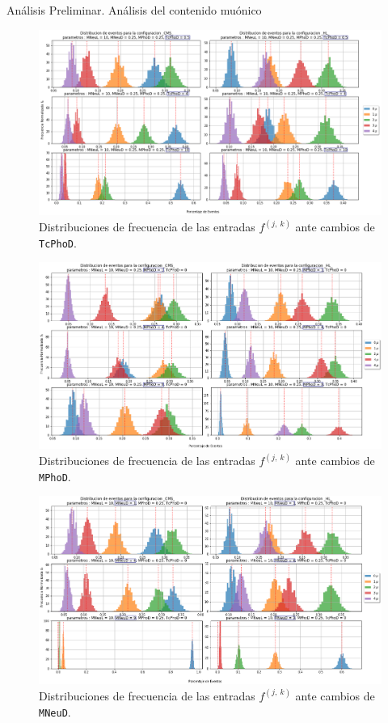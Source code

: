 \begin{frame}{Análisis Preliminar. Análisis del contenido muónico}
\begin{figure}[h]
\centering
\includegraphics[width=.9\textwidth]{Imag/Distribucion_Entries.png}
\caption{Distribuciones de frecuencia de las entradas $f^{(j,~k)}$ ante cambios de \texttt{TcPhoD}.}
\end{figure}

\framebreak

\begin{figure}[h]
\centering
\includegraphics[width=.9\textwidth]{Imag/Distribucion_Entries2.png}
\caption{Distribuciones de frecuencia de las entradas $f^{(j,~k)}$ ante cambios de \texttt{MPhoD}.}
\end{figure}

\framebreak

\begin{figure}[h]
\centering
\includegraphics[width=.9\textwidth]{Imag/Distribucion_Entries3.png}
\caption{Distribuciones de frecuencia de las entradas $f^{(j,~k)}$ ante cambios de \texttt{MNeuD}.}
\end{figure}





\end{frame}